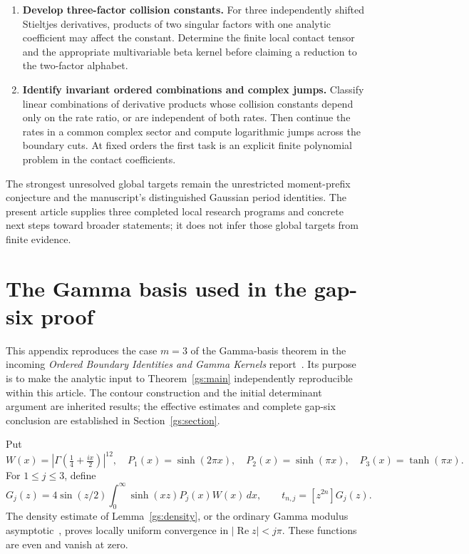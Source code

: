 \documentclass[11pt,a4paper]{article}
\theoremstyle{definition}
\theoremstyle{remark}
\numberwithin{equation}{section}
\begin{document}
\begin{enumerate}[label=\textbf{Q\arabic*.},leftmargin=*]
\item \textbf{Develop three-factor collision constants.}
For three independently shifted Stieltjes derivatives,
products of two singular factors with one analytic coefficient
may affect the constant. Determine the finite local contact
tensor and the appropriate multivariable beta kernel before
claiming a reduction to the two-factor alphabet.

\item \textbf{Identify invariant ordered combinations and complex jumps.}
Classify linear combinations of derivative products whose
collision constants depend only on the rate ratio, or are
independent of both rates. Then continue the rates in a
common complex sector and compute logarithmic jumps across
the boundary cuts. At fixed orders the first task is an
explicit finite polynomial problem in the contact coefficients.
\end{enumerate}

The strongest unresolved global targets remain the unrestricted
moment-prefix conjecture and the manuscript's distinguished
Gaussian period identities. The present article supplies three
completed local research programs and concrete next steps toward
broader statements; it does not infer those global targets from
finite evidence.



\appendix
\section{The Gamma basis used in the gap-six proof}
\label{ga:appendix}

This appendix reproduces the case $m=3$ of the Gamma-basis theorem
in the incoming \emph{Ordered Boundary Identities and Gamma Kernels}
report~\cite[Section~8]{OrderedIncoming}.  Its purpose is to make the
analytic input to Theorem~\ref{gs:main} independently reproducible
within this article.  The contour construction and the initial
determinant argument are inherited results; the effective estimates
and complete gap-six conclusion are established in Section~\ref{gs:section}.

Put
\[
 W(x)=\left|\Gamma\!\left(\tfrac14+\tfrac{ix}{2}\right)\right|^{12},
 \quad P_1(x)=\sinh(2\pi x),\quad P_2(x)=\sinh(\pi x),
 \quad P_3(x)=\tanh(\pi x).
\]
For $1\le j\le3$, define
\begin{equation}\label{ga:G}
 G_j(z)=4\sin(z/2)\int_0^\infty\sinh(xz)P_j(x)W(x)\,dx,
 \qquad t_{n,j}=[z^{2n}]G_j(z).
\end{equation}
The density estimate of Lemma~\ref{gs:density}, or the ordinary
Gamma modulus asymptotic~\cite[Equation~5.11.9]{DLMF}, proves
locally uniform convergence in $|\operatorname{Re}z|<j\pi$.
These functions are even and vanish at zero.
\end{document}
